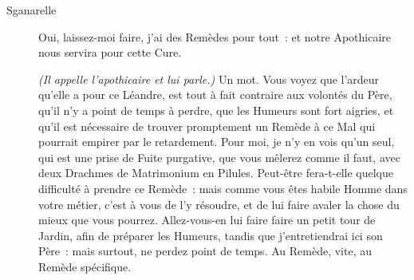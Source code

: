 \documentclass[french,twoside]{book} %
\begin{document}
 \begin{description} \item[Sganarelle] 

Oui, laissez-moi faire, j’ai des Remèdes pour tout : et notre Apothicaire nous servira pour cette Cure.

\textit{(Il appelle l’apothicaire et lui parle.) }Un mot. Vous voyez que l’ardeur qu’elle a pour ce Léandre, est tout à fait contraire aux volontés du Père, qu’il n’y a point de temps à perdre, que les Humeurs sont fort aigries, et qu’il est nécessaire de trouver promptement un Remède à ce Mal qui pourrait empirer par le retardement. Pour moi, je n’y en vois qu’un seul, qui est une prise de Fuite purgative, que vous mêlerez comme il faut, avec deux Drachmes de Matrimonium en Pilules. Peut-être fera-t-elle quelque difficulté à prendre ce Remède : mais comme vous êtes habile Homme dans votre métier, c’est à vous de l’y résoudre, et de lui faire avaler la chose du mieux que vous pourrez. Allez-vous-en lui faire faire un petit tour de Jardin, afin de préparer les Humeurs, tandis que j’entretiendrai ici son Père : mais surtout, ne perdez point de temps. Au Remède, vite, au Remède spécifique.\end{description}
\end{document}
